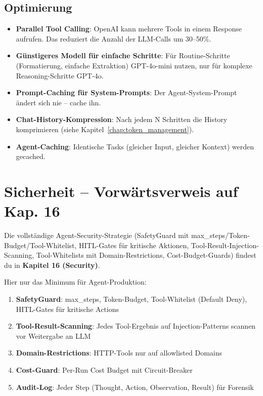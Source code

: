 \subsection{Optimierung}

\begin{itemize}[leftmargin=*]
    \item \textbf{Parallel Tool Calling}: OpenAI kann mehrere Tools in einem Response aufrufen. Das reduziert die Anzahl der LLM-Calls um 30--50\%.
    \item \textbf{Günstigeres Modell für einfache Schritte}: Für Routine-Schritte (Formatierung, einfache Extraktion) GPT-4o-mini nutzen, nur für komplexe Reasoning-Schritte GPT-4o.
    \item \textbf{Prompt-Caching für System-Prompts}: Der Agent-System-Prompt ändert sich nie -- cache ihn.
    \item \textbf{Chat-History-Kompression}: Nach jedem N Schritten die History komprimieren (siehe Kapitel~\ref{chap:token_management}).
    \item \textbf{Agent-Caching}: Identische Tasks (gleicher Input, gleicher Kontext) werden gecached.
\end{itemize}

\section{Sicherheit -- Vorwärtsverweis auf Kap. 16}


Die vollständige Agent-Security-Strategie (SafetyGuard mit max\_steps/Token-Budget/Tool-Whitelist, HITL-Gates für kritische Aktionen, Tool-Result-Injection-Scanning, Tool-Whitelists mit Domain-Restrictions, Cost-Budget-Guards) findest du in \textbf{Kapitel 16 (Security)}.

Hier nur das Minimum für Agent-Produktion:
\begin{enumerate}
    \item \textbf{SafetyGuard}: max\_steps, Token-Budget, Tool-Whitelist (Default Deny), HITL-Gates für kritische Actions
    \item \textbf{Tool-Result-Scanning}: Jedes Tool-Ergebnis auf Injection-Patterns scannen vor Weitergabe an LLM
    \item \textbf{Domain-Restrictions}: HTTP-Tools nur auf allowlisted Domains
    \item \textbf{Cost-Guard}: Per-Run Cost Budget mit Circuit-Breaker
    \item \textbf{Audit-Log}: Jeder Step (Thought, Action, Observation, Result) für Forensik
\end{enumerate}

